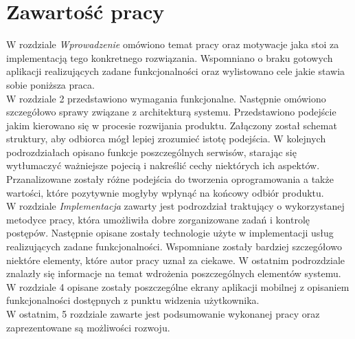 \section{Zawartość pracy}
\label{sec:zawartoscPracy}
W rozdziale \textit{Wprowadzenie} omówiono temat pracy oraz motywacje jaka stoi za implementacją tego konkretnego rozwiązania. Wspomniano o braku gotowych aplikacji realizujących zadane funkcjonalności oraz wylistowano cele jakie stawia sobie poniższa praca.
\\W rozdziale 2 przedstawiono wymagania funkcjonalne. Następnie omówiono szczegółowo sprawy związane z architekturą systemu. Przedstawiono podejście jakim kierowano się w procesie rozwijania produktu. Załączony został schemat struktury, aby odbiorca mógł lepiej zrozumieć istotę podejścia. W kolejnych podrozdziałach opisano funkcje poszczególnych serwisów, starając się wytłumaczyć ważniejsze pojecią i nakreślić cechy niektórych ich aspektów. Przanalizowane zostały różne podejścia do tworzenia oprogramowania a także wartości, które pozytywnie mogłyby wpłynąć na końcowy odbiór produktu.
\\W rozdziale \textit{Implementacja} zawarty jest podrozdział traktujący o wykorzystanej metodyce pracy, która umożliwiła dobre zorganizowane zadań i kontrolę postępów. Następnie opisane zostały technologie użyte w implementacji usług realizujących zadane funkcjonalności. Wspomniane zostały bardziej szczegółowo niektóre elementy, które autor pracy uznał za ciekawe. W ostatnim podrozdziale znalazły się informacje na temat wdrożenia poszczególnych elementów systemu.
\\W rozdziale 4 opisane zostały poszczególne ekrany aplikacji mobilnej z opisaniem funkcjonalności dostępnych z punktu widzenia użytkownika.
\\W ostatnim, 5 rozdziale zawarte jest podsumowanie wykonanej pracy oraz zaprezentowane są możliwości rozwoju.
